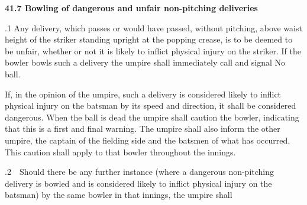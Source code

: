 \documentclass[12pt]{article}
\begin{document}
\vspace{\baselineskip}
{\fontsize{11pt}{13.2pt}\selectfont \textbf{41.7 \tabto{0.47in} Bowling of dangerous and unfair non-pitching deliveries}\par}\par


\vspace{\baselineskip}
\begin{adjustwidth}{0.5in}{0.04in}
{\fontsize{9pt}{10.8pt}.1 \tabto{0.49in} Any delivery, which passes or would have passed, without pitching, above waist height of the striker standing upright at the popping crease, is to be deemed to be unfair, whether or not it is likely to inflict physical injury on the striker. If the bowler bowls such a delivery the umpire shall immediately call and signal No ball.\par}\par

\end{adjustwidth}


\vspace{\baselineskip}
\begin{adjustwidth}{0.5in}{0.03in}
{\fontsize{9pt}{10.8pt}\selectfont If, in the opinion of the umpire, such a delivery is considered likely to inflict physical injury on the batsman by its speed and direction, it shall be considered dangerous. When the ball is dead the umpire shall caution the bowler, indicating that this is a first and final warning. The umpire shall also inform the other umpire, the captain of the fielding side and the batsmen of what has occurred. This caution shall apply to that bowler throughout the innings.\par}\par

\end{adjustwidth}


\vspace{\baselineskip}
\begin{adjustwidth}{0.0in}{0.08in}
\begin{Center}
{\fontsize{9pt}{10.8pt}.2\ \  Should there be any further instance (where a dangerous non-pitching delivery is bowled and is considered likely to inflict physical injury on the batsman) by the same bowler in that innings, the umpire shall\par}
\end{Center}\par

\end{adjustwidth}
\end{document}
